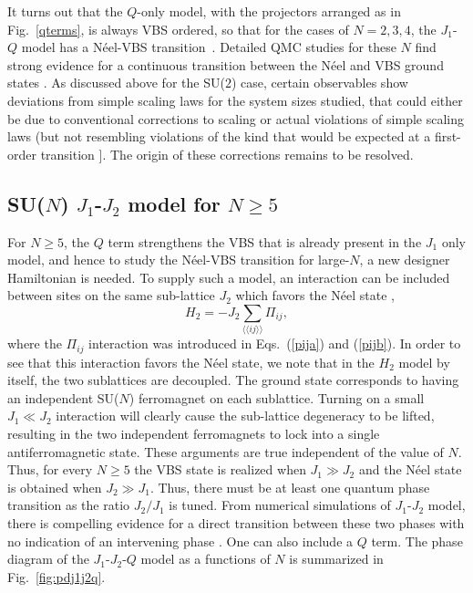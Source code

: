 \documentclass[range]{ar2e}
\begin{document}
It turns out that the $Q$-only model, with the projectors arranged as in Fig.~\ref{qterms}, is always VBS ordered, so that for the cases of $N=2,3,4$, 
the $J_1$-$Q$ model has a N\'eel-VBS transition~\cite{Sandvik07,lou2009:sun}. Detailed QMC studies for these $N$ find strong evidence for a 
continuous transition between the N\'eel and VBS ground states \cite{melko2008:jq,kaul2011:su34,banerjee2010:log,banerjee2010:su3}. 
As discussed above for the SU($2$) case, certain observables show deviations from simple scaling laws for the system sizes studied, that could either 
be due to conventional corrections to scaling or actual violations of simple scaling laws (but not resembling violations of the kind that would be 
expected at a first-order transition \cite{Sandvik10c}]. The origin of these corrections remains to be resolved.

\subsection{SU($N$) $J_1$-$J_2$ model for $N\geq 5$}
\label{ss:j1j2N}

For $N\geq 5$, the $Q$ term strengthens the VBS that is already present in the $J_1$ only model, and hence to study the N\'eel-VBS transition 
for large-$N$, a new designer Hamiltonian is needed. To supply such a model, an interaction can be included
between sites on the same sub-lattice $J_2$ which favors the N\'eel state \cite{kaul2011:j1j2},
\begin{equation}
H_{2}= -J_2 \sum_{\langle\langle ij\rangle\rangle} \Pi_{ij},
\end{equation}
where the $\Pi_{ij}$ interaction was introduced in Eqs.~(\ref{pija}) and (\ref{pijb}).
In order to see that this interaction favors the N\'eel state, we note that in the $H_{2}$ model by itself, the two sublattices 
are decoupled. The ground state corresponds to having an independent SU($N$) ferromagnet on each sublattice. Turning on a small $J_1\ll J_2$ 
interaction will clearly cause the sub-lattice degeneracy to be lifted, resulting in the two independent ferromagnets to lock into a single
antiferromagnetic state. These arguments are true independent of the value of $N$. Thus, for every $N\geq 5$ the VBS state is realized when 
$J_1\gg J_2$ and the N\'eel state is obtained when $J_2 \gg J_1$. Thus, there must be at least one quantum phase transition as the ratio
$J_2/J_1$ is tuned. From numerical simulations of $J_1$-$J_2$ model, there is compelling evidence for a direct transition between these two 
phases with no indication of an intervening phase \cite{kaul2011:j1j2}. One can also include a $Q$ term. The phase diagram of the $J_1$-$J_2$-$Q$ model as a functions 
of $N$ is summarized in Fig.~\ref{fig:pdj1j2q}.
\end{document}
